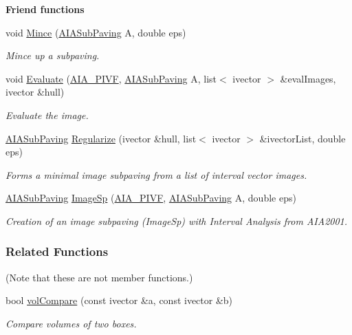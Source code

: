 \begin{Indent}{\bf \-Friend functions}
\begin{DoxyCompactItemize}
void \hyperlink{classAIASPnode_ab7921c5bd80f01985ee134c5d2ab595d}{\-Mince} (\hyperlink{AIAsubpaving_8hpp_ab6618d8727b32e897c1b7ab3415b93ff}{\-A\-I\-A\-Sub\-Paving} \-A, double eps)
\begin{DoxyCompactList}\small\item\em \-Mince up a subpaving. \end{DoxyCompactList}\item 
void \hyperlink{classAIASPnode_a1032a6cd48f87337e0980fe290c140b8}{\-Evaluate} (\hyperlink{AIAsubpaving_8hpp_aee443215927e43ef8f6880f25b053a2e}{\-A\-I\-A\-\_\-\-P\-I\-V\-F}, \hyperlink{AIAsubpaving_8hpp_ab6618d8727b32e897c1b7ab3415b93ff}{\-A\-I\-A\-Sub\-Paving} \-A, list$<$ ivector $>$ \&eval\-Images, ivector \&hull)
\begin{DoxyCompactList}\small\item\em \-Evaluate the image. \end{DoxyCompactList}\item 
\hyperlink{AIAsubpaving_8hpp_ab6618d8727b32e897c1b7ab3415b93ff}{\-A\-I\-A\-Sub\-Paving} \hyperlink{classAIASPnode_a1b1148d30745256482cbc7cca090253d}{\-Regularize} (ivector \&hull, list$<$ ivector $>$ \&ivector\-List, double eps)
\begin{DoxyCompactList}\small\item\em \-Forms a minimal image subpaving from a list of interval vector images. \end{DoxyCompactList}\item 
\hyperlink{AIAsubpaving_8hpp_ab6618d8727b32e897c1b7ab3415b93ff}{\-A\-I\-A\-Sub\-Paving} \hyperlink{classAIASPnode_aa860838286031ef8164937725092a2c2}{\-Image\-Sp} (\hyperlink{AIAsubpaving_8hpp_aee443215927e43ef8f6880f25b053a2e}{\-A\-I\-A\-\_\-\-P\-I\-V\-F}, \hyperlink{AIAsubpaving_8hpp_ab6618d8727b32e897c1b7ab3415b93ff}{\-A\-I\-A\-Sub\-Paving} \-A, double eps)
\begin{DoxyCompactList}\small\item\em \-Creation of an image subpaving (\-Image\-Sp) with \-Interval \-Analysis from \-A\-I\-A2001. \end{DoxyCompactList}\end{DoxyCompactItemize}
\end{Indent}
\subsubsection*{\-Related \-Functions}
(\-Note that these are not member functions.) \begin{DoxyCompactItemize}
\item 
bool \hyperlink{classAIASPnode_a8713b30834070a586c0b99d9899f9b74}{vol\-Compare} (const ivector \&a, const ivector \&b)
\begin{DoxyCompactList}\small\item\em \-Compare volumes of two boxes. \end{DoxyCompactList}\end{DoxyCompactItemize}



